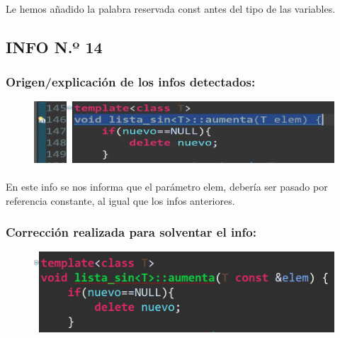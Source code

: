 			\paragraph{}Le hemos añadido la palabra reservada const antes del tipo de las variables.
			
	\subsection{ INFO N.º 14}
	
		\subsubsection{Origen/explicación de los infos detectados:}
		
			\begin{figure}[H]
				\centering
				\includegraphics[scale=0.55]{img/esteban20.png}
				\label{esteban20}
			\end{figure}
		
			\paragraph{}En este info se nos informa que el parámetro elem, debería ser pasado por referencia constante, al igual que los infos anteriores.
			
		\subsubsection{Corrección realizada para solventar el info:}
		
			\begin{figure}[H]
				\centering
				\includegraphics[scale=0.55]{img/esteban21.png}
				\label{esteban21}
			\end{figure}
		
